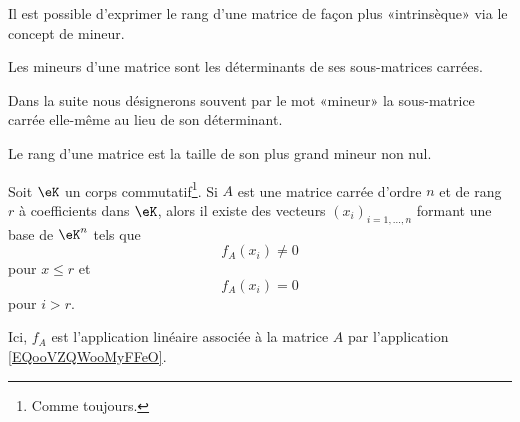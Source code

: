 Il est possible d'exprimer le rang d'une matrice de façon plus «intrinsèque» via le concept de mineur.
\begin{definition}
    Les mineurs d'une matrice sont les déterminants de ses sous-matrices carrées.
\end{definition}
Dans la suite nous désignerons souvent par le mot «mineur» la sous-matrice carrée elle-même au lieu de son déterminant.

\begin{proposition}      \label{DEFooVVBYooJbliTi}
    Le rang d'une matrice est la taille de son plus grand mineur non nul.
\end{proposition}

\begin{lemma} \label{LEMVecsaRgFixe}
    Soit \( \eK \) un corps commutatif\footnote{Comme toujours.}. Si \( A \) est une matrice carrée d'ordre \( n \) et de rang \( r \) à coefficients dans \( \eK \), alors il existe des vecteurs \( (x_i)_{i=1,\dots,n} \) formant une base de \( \eK^n \) tels que 
    \begin{equation}
        f_A(x_i)\neq 0
    \end{equation}
    pour \( x\leq r\) et
    \begin{equation}
        f_A(x_i) = 0
    \end{equation}
    pour \( i > r \).

    Ici, \( f_A\) est l'application linéaire associée à la matrice \( A\) par l'application \eqref{EQooVZQWooMyFFeO}.
\end{lemma}

